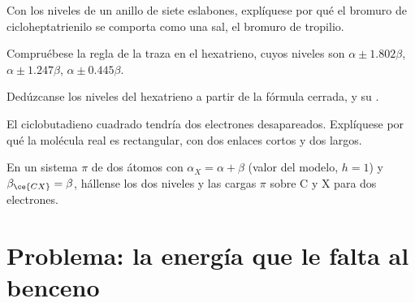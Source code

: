 \begin{exercise}[$\star\star$]\label{exo:b2:huckel:8}
Con los niveles de un anillo de siete eslabones, explíquese por qué el bromuro de cicloheptatrienilo
se comporta como una sal, el bromuro de tropilio.
\end{exercise}

\begin{exercise}[$\star\star$]\label{exo:b2:huckel:9}
Compruébese la regla de la traza en el hexatrieno, cuyos niveles son $\alpha \pm 1.802\beta$, $\alpha \pm
1.247\beta$, $\alpha \pm 0.445\beta$.
\end{exercise}

\begin{exercise}[$\star\star\star$]\label{exo:b2:huckel:10}
Dedúzcanse los niveles del hexatrieno a partir de la fórmula cerrada, y su .
\end{exercise}

\begin{exercise}[$\star\star\star$]\label{exo:b2:huckel:11}
El ciclobutadieno cuadrado tendría dos electrones desapareados. Explíquese por qué la molécula real
es rectangular, con dos enlaces cortos y dos largos.
\end{exercise}

\begin{exercise}[$\star\star\star$]\label{exo:b2:huckel:12}
En un sistema $\pi$ de dos átomos  con $\alpha_X = \alpha + \beta$ (valor del modelo, $h = 1$) y
$\beta_{\ce{CX}} = \beta$, hállense los dos niveles y las cargas $\pi$ sobre C y X para dos
electrones.
\end{exercise}

\section{Problema: la energía que le falta al benceno}

